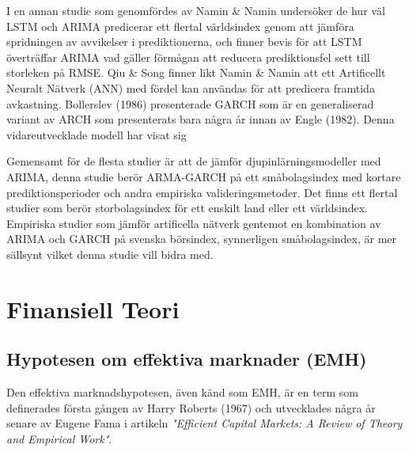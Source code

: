 \documentclass[11pt]{article}
\numberwithin{equation}{section}
\numberwithin{table}{section}
\numberwithin{figure}{section}
\begin{document}
I en annan studie som genomfördes av Namin \& Namin \parencite*{siaminamini2018forecasting} undersöker de hur väl LSTM och ARIMA predicerar ett flertal världsindex genom att jämföra spridningen av avvikelser i prediktionerna, och finner bevis för att LSTM överträffar ARIMA vad gäller förmågan att reducera prediktionsfel sett till storleken på RMSE. Qiu \& Song \parencite*{10.1371/journal.pone.0155133} finner likt Namin \& Namin \parencite*{siaminamini2018forecasting} att ett Artificellt Neuralt Nätverk (ANN) med fördel kan användas för att predicera framtida avkastning. Bollerslev (1986) presenterade GARCH som är en generaliserad variant av ARCH som presenterats bara några år innan av Engle (1982). Denna vidareutvecklade modell har visat sig 


Gemensamt för de flesta studier är att de jämför djupinlärningsmodeller med ARIMA, denna studie berör ARMA-GARCH på ett småbolagsindex med kortare prediktionsperioder och andra empiriska valideringsmetoder. Det finns ett flertal studier som berör storbolagsindex för ett enskilt land eller ett världsindex. Empiriska studier som jämför artificella nätverk gentemot en kombination av ARIMA och GARCH på svenska börsindex, synnerligen småbolagsindex, är mer sällsynt vilket denna studie vill bidra med. 

 

\newpage
\section{Finansiell Teori}

\subsection{Hypotesen om effektiva marknader (EMH)}
Den effektiva marknadshypotesen, även känd som EMH, är en term som definerades första gången av Harry Roberts (1967) och utvecklades några år senare av Eugene Fama \parencite*{Fama1970} i artikeln \emph{"Efficient Capital Markets: A Review of Theory and Empirical Work"}. 
\end{document}
